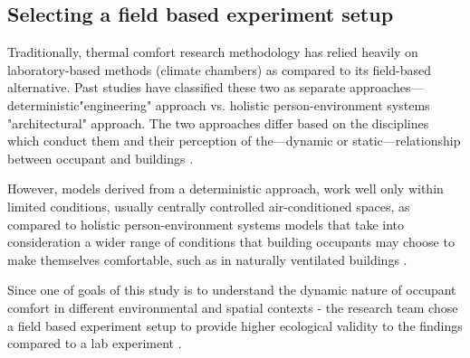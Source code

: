 \documentclass[]{interact}
\theoremstyle{plain}%
\theoremstyle{definition}
\theoremstyle{remark}
\begin{document}
\subsection{Selecting a field based experiment setup}
Traditionally, thermal comfort research methodology has relied heavily on laboratory-based methods (climate chambers) as compared to its field-based alternative. Past studies have classified these two as separate approaches---deterministic"engineering" approach vs. holistic person-environment systems "architectural" approach. The two approaches differ based on the disciplines which conduct them and their perception of the---dynamic or static---relationship between occupant and buildings \cite{dedear}.

However, models derived from a deterministic approach, work well only within limited conditions, usually centrally controlled air-conditioned spaces, as compared to holistic person-environment systems models that take into consideration a wider range of conditions that building occupants may choose to make themselves comfortable, such as in naturally ventilated buildings \cite{dedear2, de1998developing}. 

Since one of goals of this study is to understand the dynamic nature of occupant comfort in different environmental and spatial contexts - the research team chose a field based experiment setup to provide higher ecological validity to the findings compared to a lab experiment \cite{andrade2018internal}. 




\end{document}
